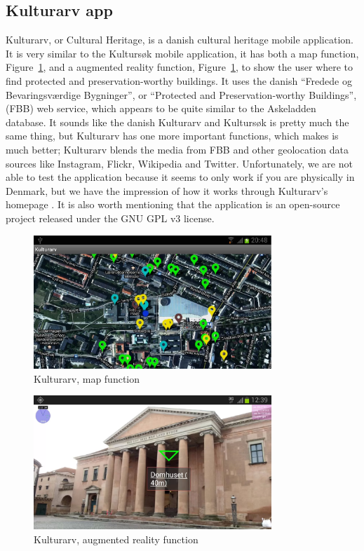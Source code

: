 \documentclass[11pt]{book}
\begin{document}
\subsection{Kulturarv app}
Kulturarv, or Cultural Heritage, is a danish cultural heritage mobile application. It is very similar to the Kultursøk mobile application, it has both a map function, Figure~\ref{fig:pre_kulturArvAppMap}, and a augmented reality function, Figure~\ref{fig:pre_kulturArvAppMap},  to show the user where to find protected and preservation-worthy buildings. It uses the danish ``Fredede og Bevaringsværdige Bygninger'', or  ``Protected and Preservation-worthy Buildings'', (FBB) web service, which appears to be quite similar to the Askeladden database. It sounds like the danish Kulturarv and Kultursøk is pretty much the same thing, but Kulturarv has one more important functions, which makes is much better; Kulturarv blends the media from FBB and other geolocation data sources like Instagram, Flickr, Wikipedia and Twitter. Unfortunately, we are not able to test the application because it seems to only work if you are physically in Denmark, but we have the impression of how it works through Kulturarv's homepage \cite{Kulturarv}. It is also worth  mentioning that the application is an open-source project released under the GNU GPL v3 license.

\begin{figure}[H]
      \centering
      \includegraphics[width=0.8\textwidth]{Figures/Prestudy/kulturArvMap.png}
      \caption{Kulturarv, map function}
      \label{fig:pre_kulturArvAppMap}
\end{figure}

\begin{figure}[H]
      \centering
      \includegraphics[width=0.8\textwidth]{Figures/Prestudy/kulturArvAR1.png}
      \caption{Kulturarv, augmented reality function}
      \label{fig:pre_kulturArvAppAug}
\end{figure}
\end{document}
